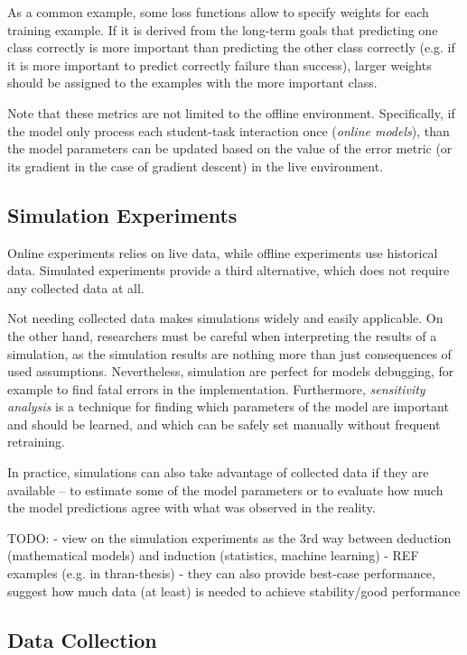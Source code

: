 As a common example, some loss functions allow to specify weights for each training example.
If it is derived from the long-term goals that predicting one class correctly
  is more important than predicting the other class correctly
  (e.g. if it is more important to predict correctly failure than success),
  larger weights should be assigned to the examples with the more important class.

Note that these metrics are not limited to the offline environment. Specifically, if the
model only process each student-task interaction once (\emph{online models}), than the
model parameters can be updated based on the value of the error metric
(or its gradient in the case of gradient descent) in the live environment.

\subsection{Simulation Experiments}

Online experiments relies on live data,
while offline experiments use historical data.
Simulated experiments provide a third alternative,
  which does not require any collected data at all.

Not needing collected data makes simulations widely and easily applicable.
On the other hand, researchers must be careful when interpreting
  the results of a simulation, as the simulation results are nothing more than
  just consequences of used assumptions.
Nevertheless, simulation are perfect for models debugging,
  for example to find fatal errors in the implementation.
Furthermore, \emph{sensitivity analysis} is a technique for finding
  which parameters of the model are important and should be learned,
  and which can be safely set manually without frequent retraining.

In practice, simulations can also take advantage of collected data
  if they are available -- to estimate some of the model parameters
  or to evaluate how much the model predictions agree with
  what was observed in the reality.


TODO:
- view on the simulation experiments as the 3rd way between deduction (mathematical models) and induction (statistics, machine learning)
- REF examples (e.g. in thran-thesis)
- they can also provide best-case performance, suggest how much data (at least) is needed to achieve stability/good performance



\subsection{Data Collection}

